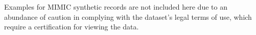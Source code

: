 Examples for MIMIC synthetic records are not included here due to an abundance of caution in complying with the dataset's legal terms of use, which require a certification for viewing the data.

















